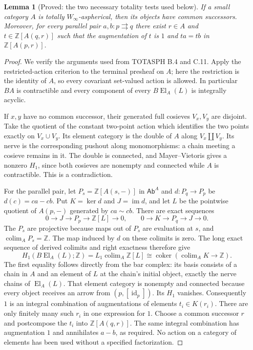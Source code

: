 \documentclass[11pt,a4paper]{article}
\newtheorem{lemma}[theorem]{Lemma}
\theoremstyle{definition}
\theoremstyle{remark}
\begin{document}
\begin{lemma}[Proved: the two necessary totality tests used below]
\label{E:necessary-tests}
If a small category $A$ is totally $W_\infty$-aspherical, then its objects
have common successors.  Moreover, for every parallel pair
$a,b:p\rightrightarrows q$ there exist $r\in A$ and
$t\in\mathbb Z[A(q,r)]$ such that the augmentation of $t$ is $1$ and
$ta=tb$ in $\mathbb Z[A(p,r)]$.
\end{lemma}
\begin{proof}
We verify the arguments used from TOTASPH B.4 and C.11.  Apply the
restricted-action criterion to the terminal presheaf on $A$; here the
restriction is the identity of $A$, so every covariant set-valued action
is allowed.  In particular $BA$ is contractible and every component of
every $B\operatorname{El}_A(L)$ is integrally acyclic.

If $x,y$ have no common successor, their generated full cosieves
$V_x,V_y$ are disjoint.  Take the quotient of the constant two-point
action which identifies the two points exactly on $V_x\cup V_y$.
Its element category is the double of $A$ along $V_x\amalg V_y$.
Its nerve is the corresponding pushout along monomorphisms: a chain
meeting a cosieve remains in it.  The double is connected, and
Mayer--Vietoris gives a nonzero $H_1$, since both cosieves are nonempty
and connected while $A$ is contractible.  This is a contradiction.

For the parallel pair, let $P_s=\mathbb Z[A(s,-)]$ in
$\mathsf{Ab}^{A}$ and $d:P_q\to P_p$ be $d(c)=ca-cb$.  Put
$K=\ker d$ and $J=\operatorname{im}d$, and let $L$ be the pointwise
quotient of $A(p,-)$ generated by $ca\sim cb$.  There are exact
sequences
\[
0\longrightarrow J\longrightarrow P_p\longrightarrow\mathbb Z[L]
\longrightarrow0,
\qquad
0\longrightarrow K\longrightarrow P_q\longrightarrow J
\longrightarrow0.
\]
The $P_s$ are projective because maps out of $P_s$ are evaluation at
$s$, and $\operatorname{colim}_A P_s=\mathbb Z$.  The map induced by
$d$ on these colimits is zero.  The long exact sequence of derived
colimits and right exactness therefore give
\[
H_1(B\operatorname{El}_A(L);\mathbb Z)
 =L_1\operatorname{colim}_A\mathbb Z[L]
 \cong\operatorname{coker}(\operatorname{colim}_A K\longrightarrow
 \mathbb Z).
\]
The first equality follows directly from the bar complex: its basis
consists of a chain in $A$ and an element of $L$ at the chain's initial
object, exactly the nerve chains of $\operatorname{El}_A(L)$.
That element category is nonempty and connected because every object
receives an arrow from $(p,[\operatorname{id}_p])$.  Its $H_1$ vanishes.
Consequently $1$ is an integral combination of augmentations of
elements $t_i\in K(r_i)$.  There are only finitely many such $r_i$ in
one expression for $1$.  Choose a common successor $r$ and postcompose
the $t_i$ into $\mathbb Z[A(q,r)]$.  The same integral combination has
augmentation $1$ and annihilates $a-b$, as required.  No action on a
category of elements has been used without a specified factorization.
\end{proof}
\end{document}
